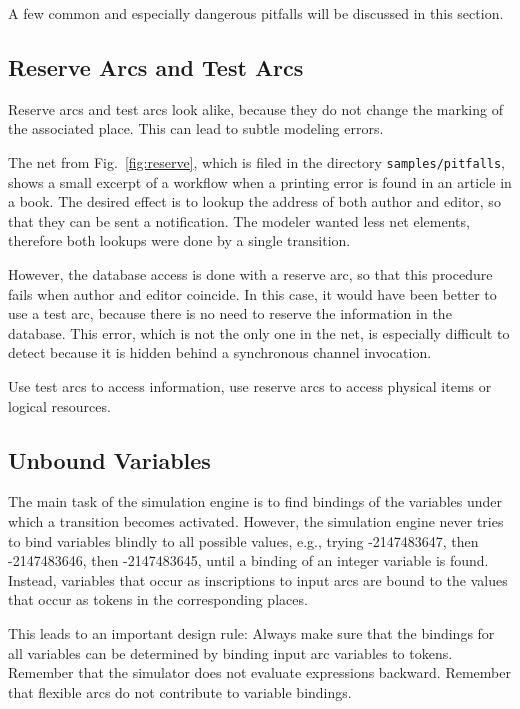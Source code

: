 A few common and especially dangerous pitfalls will be discussed
in this section.


\subsection{Reserve Arcs and Test Arcs}
\label{subsec:reserveAndTestArcs}

Reserve arcs and test arcs look alike, because they
do not change the marking of the associated place.
This can lead to subtle modeling errors.


The net from Fig.~\ref{fig:reserve}, which is filed in the
directory \texttt{samples/pitfalls}, shows a small excerpt of
a workflow when a printing error is found in an article in a book.
The desired effect is to lookup the address of both author and
editor, so that they can be sent a notification. The modeler wanted
less net elements, therefore both lookups were done by a single
transition.

However, the database access is done with a reserve arc, so that
this procedure fails when author and editor coincide.
In this case, it would have been better to use a test arc,
because there is no need to reserve the information in the database.
This error, which is not the only one in the net, is especially
difficult to detect because it is
hidden behind a synchronous channel invocation.

Use test arcs to access information, use reserve arcs to access
physical items or logical resources.


\subsection{Unbound Variables}

The main task of the simulation engine is to find bindings
of the variables under which a transition becomes
activated. However, the simulation engine never tries to bind
variables blindly to all possible values, e.g., trying
-2147483647, then -2147483646, then -2147483645, until a binding
of an integer variable is found. Instead, variables that occur
as inscriptions to input arcs are bound to the values that
occur as tokens in the corresponding places.

This leads to an important design rule: Always make sure that
the bindings for all variables can be determined by binding
input arc variables to tokens. Remember that the simulator
does not evaluate expressions backward. Remember that
flexible arcs do not contribute to variable bindings.

